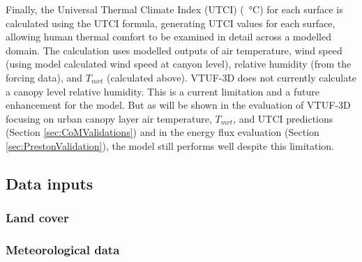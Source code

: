 \documentclass[final,3p,times,authoryear]{elsarticle}
\begin{document}
Finally, the Universal Thermal Climate Index (UTCI) (\SI{}{\degreeCelsius}) for each surface is calculated using the \cite{Brode2009u} UTCI formula, generating UTCI values for each surface, allowing human thermal comfort to be examined in detail across a modelled domain. The calculation uses modelled outputs of air temperature, wind speed (using model calculated wind speed at canyon level), relative humidity (from the forcing data), and $T_{mrt}$ (calculated above). VTUF-3D does not currently calculate a canopy level relative humidity. This is a current limitation and a future enhancement for the model. But as will be shown in the evaluation of VTUF-3D focusing on urban canopy layer air temperature, $T_{mrt}$, and UTCI predictions (Section \ref{sec:CoMValidations}) and in the energy flux evaluation (Section \ref{sec:PrestonValidation}), the model still performs well despite this limitation. 




\subsection{Data inputs}\label{sec:datainputs}
\subsubsection{Land cover}\label{sec:landcover}


\subsubsection{Meteorological data}\label{sec:metdata}
\end{document}

